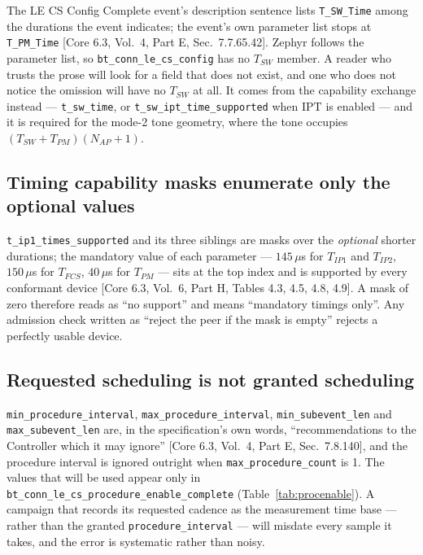 \documentclass[11pt,a4paper]{article}
\newcommand{\us}{\,\ensuremath{\upmu}s}
\newcommand{\code}[1]{\texttt{\small #1}}
\newcommand{\IPT}{\ensuremath{\mathrm{IPT}}}
\newcommand{\Nap}{\ensuremath{N_{AP}}}
\providecommand{\upmu}{\mu}
\newcommand{\core}[1]{\textcolor{rulegrey}{\small[Core 6.3, #1]}}
\newcommand{\Tpm}{\ensuremath{T_{PM}}}
\newcommand{\Tsw}{\ensuremath{T_{SW}}}
\begin{document}
The LE CS Config Complete event's description sentence lists \code{T\_\allowbreak{}SW\_\allowbreak{}Time} among the
durations the event indicates; the event's own parameter list stops at \code{T\_\allowbreak{}PM\_\allowbreak{}Time}
\core{Vol.\ 4, Part E, Sec.\ 7.7.65.42}. Zephyr follows the parameter list, so
\code{bt\_\allowbreak{}conn\_\allowbreak{}le\_\allowbreak{}cs\_\allowbreak{}config} has no \Tsw{} member. A reader who trusts the prose will
look for a field that does not exist, and one who does not notice the omission will have no \Tsw{} at
all. It comes from the capability exchange instead --- \code{t\_\allowbreak{}sw\_\allowbreak{}time}, or
\code{t\_\allowbreak{}sw\_\allowbreak{}ipt\_\allowbreak{}time\_\allowbreak{}supported} when \IPT{} is enabled --- and it is required for the
mode-2 tone geometry, where the tone occupies $(\Tsw+\Tpm)(\Nap+1)$.

\subsection{Timing capability masks enumerate only the optional values}

\code{t\_\allowbreak{}ip1\_\allowbreak{}times\_\allowbreak{}supported} and its three siblings are masks over the \emph{optional}
shorter durations; the mandatory value of each parameter --- $145$\us{} for $T_{IP1}$ and $T_{IP2}$,
$150$\us{} for $T_{FCS}$, $40$\us{} for \Tpm{} --- sits at the top index and is supported by every
conformant device \core{Vol.\ 6, Part H, Tables 4.3, 4.5, 4.8, 4.9}. A mask of zero therefore reads
as ``no support'' and means ``mandatory timings only''. Any admission check written as ``reject the
peer if the mask is empty'' rejects a perfectly usable device.

\subsection{Requested scheduling is not granted scheduling}

\code{min\_\allowbreak{}procedure\_\allowbreak{}interval}, \code{max\_\allowbreak{}procedure\_\allowbreak{}interval},
\code{min\_\allowbreak{}subevent\_\allowbreak{}len} and \code{max\_\allowbreak{}subevent\_\allowbreak{}len} are, in the specification's own
words, ``recommendations to the Controller which it may ignore''
\core{Vol.\ 4, Part E, Sec.\ 7.8.140}, and the procedure interval is ignored outright when
\code{max\_\allowbreak{}procedure\_\allowbreak{}count} is 1. The values that will be used appear only in
\code{bt\_\allowbreak{}conn\_\allowbreak{}le\_\allowbreak{}cs\_\allowbreak{}procedure\_\allowbreak{}enable\_\allowbreak{}complete}
(Table~\ref{tab:procenable}). A campaign that records its requested cadence as the measurement time
base --- rather than the granted \code{procedure\_\allowbreak{}interval} --- will misdate every sample it
takes, and the error is systematic rather than noisy.
\end{document}
